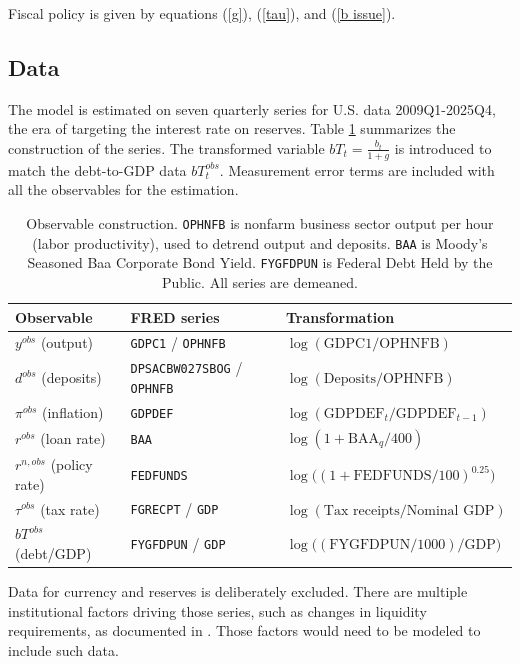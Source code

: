 \documentclass[]{article}
\begin{document}
Fiscal policy is given by equations (\ref{g}), (\ref{tau}), and (\ref{b issue}).

\subsection{Data}

The model is estimated on seven quarterly series for U.S. data 2009Q1-2025Q4, the era of targeting the interest rate on reserves. Table \ref{tab:data} summarizes the construction of the series. The transformed variable $bT_t = \frac{b_t}{1+g}$ is introduced to match the debt-to-GDP data $bT_{t}^{obs}$. Measurement error terms are included with all the observables for the estimation.

\begin{table}[h]
\centering
\small
\begin{tabular}{@{}lll@{}}
\toprule
Observable & FRED series & Transformation \\
\midrule
$y^{obs}$ (output) & \texttt{GDPC1} / \texttt{OPHNFB} &
  $\log(\text{GDPC1}/\text{OPHNFB})$ \\
$d^{obs}$ (deposits) & \texttt{DPSACBW027SBOG} / \texttt{OPHNFB} &
  $\log(\text{Deposits}/\text{OPHNFB})$ \\
$\pi^{obs}$ (inflation) & \texttt{GDPDEF} &
  $\log(\text{GDPDEF}_t/\text{GDPDEF}_{t-1})$ \\
$r^{obs}$ (loan rate) & \texttt{BAA} &
  $\log(1+\text{BAA}_q/400)$ \\
$r^{n,obs}$ (policy rate) & \texttt{FEDFUNDS} &
  $\log\!\big((1+\text{FEDFUNDS}/100)^{0.25}\big)$ \\
$\tau^{obs}$ (tax rate) & \texttt{FGRECPT} / \texttt{GDP} &
  $\log(\text{Tax receipts}/\text{Nominal GDP})$\\
$bT^{obs}$ (debt/GDP) & \texttt{FYGFDPUN} / \texttt{GDP} &
  $\log\big((\text{FYGFDPUN}/1000)/\text{GDP}\big)$\\
\bottomrule
\end{tabular}
\caption{Observable construction. \texttt{OPHNFB} is nonfarm business
sector output per hour (labor productivity), used to detrend output and
deposits. \texttt{BAA} is Moody's Seasoned Baa Corporate Bond Yield. \texttt{FYGFDPUN} is Federal Debt Held by the Public. All series are demeaned.}
\label{tab:data}
\end{table}

Data for currency and reserves is deliberately excluded. There are multiple institutional factors driving those series, such as changes in liquidity requirements, as documented in \textcite{Duffie2026}. Those factors would need to be modeled to include such data.
\end{document}
